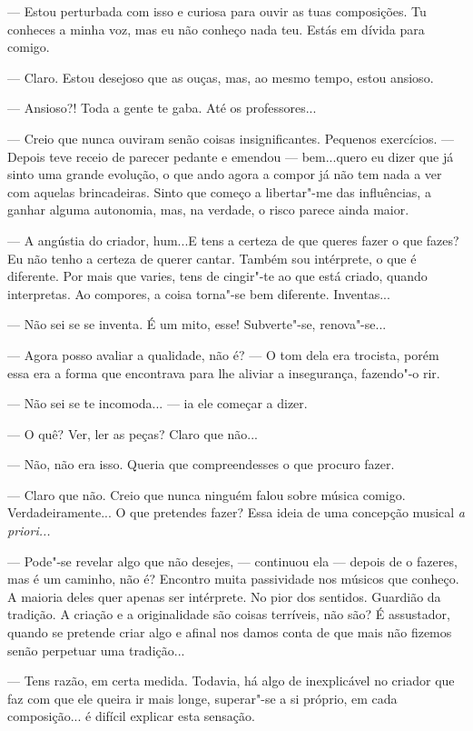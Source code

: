 --- Estou perturbada com isso e curiosa para ouvir as tuas composições. Tu
conheces a minha voz, mas eu não conheço nada teu. Estás em dívida para
comigo.

--- Claro. Estou desejoso que as ouças, mas, ao mesmo tempo, estou
ansioso.

--- Ansioso?! Toda a gente te gaba. Até os professores...

--- Creio que nunca ouviram senão coisas insignificantes. Pequenos
exercícios. --- Depois teve receio de parecer pedante e emendou ---
bem...quero eu dizer que já sinto uma grande evolução, o que ando agora
a compor já não tem nada a ver com aquelas brincadeiras. Sinto que
começo a libertar"-me das influências, a ganhar alguma autonomia, mas, na
verdade, o risco parece ainda maior.

--- A angústia do criador, hum...E tens a certeza de que queres fazer o
que fazes? Eu não tenho a certeza de querer cantar. Também sou
intérprete, o que é diferente. Por mais que varies, tens de cingir"-te ao
que está criado, quando interpretas. Ao compores, a coisa torna"-se bem
diferente. Inventas...

--- Não sei se se inventa. É um mito, esse! Subverte"-se, renova"-se...

--- Agora posso avaliar a qualidade, não é? --- O tom dela era trocista,
porém essa era a forma que encontrava para lhe aliviar a insegurança,
fazendo"-o rir.

--- Não sei se te incomoda... --- ia ele começar a dizer.

--- O quê? Ver, ler as peças? Claro que não...

--- Não, não era isso. Queria que compreendesses o que procuro fazer.

--- Claro que não. Creio que nunca ninguém falou sobre música comigo.
Verdadeiramente... O que pretendes fazer? Essa ideia de uma concepção
musical \emph{a priori...}

--- Pode"-se revelar algo que não desejes, --- continuou ela --- depois
de o fazeres, mas é um caminho, não é? Encontro muita passividade nos
músicos que conheço. A maioria deles quer apenas ser intérprete. No pior
dos sentidos. Guardião da tradição. A criação e a originalidade são
coisas terríveis, não são? É assustador, quando se pretende criar algo e
afinal nos damos conta de que mais não fizemos senão perpetuar uma
tradição...

--- Tens razão, em certa medida. Todavia, há algo de inexplicável no
criador que faz com que ele queira ir mais longe, superar"-se a si
próprio, em cada composição... é difícil explicar esta sensação.

